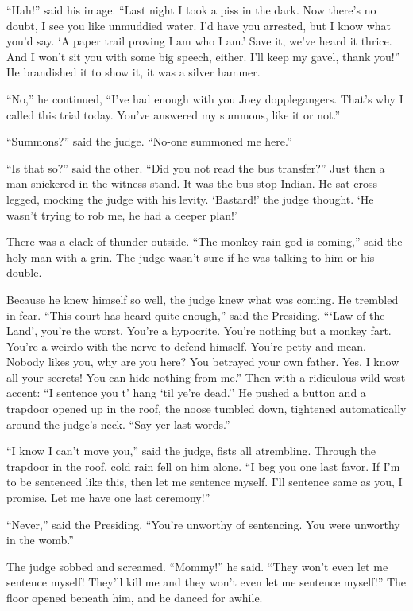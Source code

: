 \documentclass[oneside]{book}
\begin{document}
``Hah!'' said his image.  ``Last night I took a piss in the dark.  Now there's no doubt, I see
you like unmuddied water.  I'd have you arrested, but I know what you'd say.  `A paper trail proving
I am who I am.'  Save it, we've heard it thrice.  And I won't sit you with some big speech, either.
I'll keep my gavel, thank you!''
He brandished it to show it, it was a silver hammer.

``No,'' he continued, ``I've had enough with you Joey dopplegangers.
That's why I called this trial today.  You've answered my summons, like it or not.''

``Summons?'' said the judge.  ``No-one summoned me here.''

``Is that so?'' said the other.  ``Did you not read the bus transfer?''  Just then a man snickered
in the witness stand.  It was the bus stop Indian.  He sat cross-legged, mocking
the judge with his levity.  `Bastard!' the judge thought.
`He wasn't trying to rob me, he had a deeper plan!'

There was a clack of thunder outside.  ``The monkey rain god
is coming,'' said the holy man with a grin.  The judge wasn't sure if he was talking to him or his double.

Because he knew himself so well, the judge knew what was coming.  He trembled in fear.
``This court has heard quite enough,'' said the Presiding.  {``}`Law of the Land', you're the worst.
You're a hypocrite.  You're nothing but a monkey fart.  You're a weirdo with the nerve to defend himself.
You're petty and mean.
Nobody likes you, why are you here?  You betrayed your own father.  Yes, I know all your secrets!  You can
hide nothing from me.''
Then with a ridiculous wild west accent:
``I sentence you t' hang `til ye're dead.''  He pushed a button and a trapdoor opened
up in the roof, the noose tumbled down, tightened automatically around the judge's neck.
``Say yer last words.''

``I know I can't move you,'' said the judge, fists all atrembling.  Through the trapdoor in the roof,
cold rain fell on him alone.  ``I beg you one last favor.
If I'm to be sentenced like this, then let me sentence myself.  I'll sentence same as you, I promise.  Let
me have one last ceremony!''

``Never,'' said the Presiding.  ``You're unworthy of sentencing.  You were unworthy in the womb.''

The judge sobbed and screamed.  ``Mommy!'' he said.  ``They won't even let me sentence myself!
They'll kill me and they won't even let me sentence myself!''  The floor opened beneath him,
and he danced for awhile.
\end{document}
